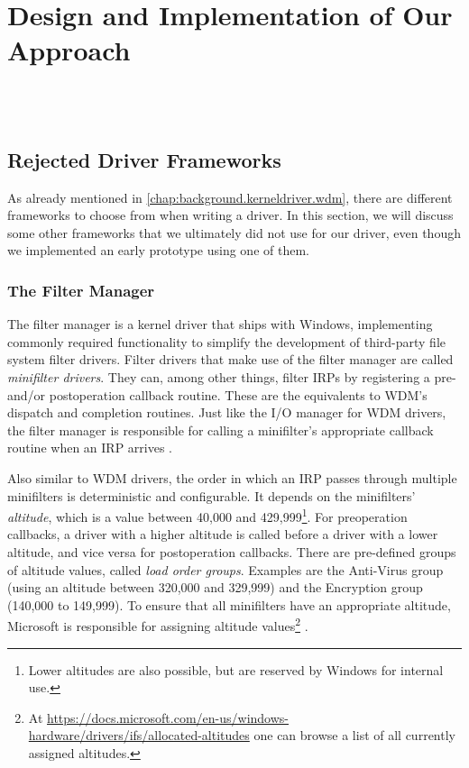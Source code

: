 \chapter{Design and Implementation of Our Approach}
\label{chap:ourapproach}
\\
\\

\section{Rejected Driver Frameworks}
\label{chap:ourapproach.rejected}
As already mentioned in \autoref{chap:background.kerneldriver.wdm}, there are different frameworks to choose from when writing a driver. In this section, we will discuss some other frameworks that we ultimately did not use for our driver, even though we implemented an early prototype using one of them.

\subsection{The Filter Manager}
\label{chap:ourapproach.rejected.fltmgr}
The filter manager is a kernel driver that ships with Windows, implementing commonly required functionality to simplify the development of third-party file system filter drivers. Filter drivers that make use of the filter manager are called \emph{minifilter drivers}. They can, among other things, filter IRPs by registering a pre- and/or postoperation callback routine. These are the equivalents to WDM's dispatch and completion routines. Just like the I/O manager for WDM drivers, the filter manager is responsible for calling a minifilter's appropriate callback routine when an IRP arrives \cite{Fltmgr}.

Also similar to WDM drivers, the order in which an IRP passes through multiple minifilters is deterministic and configurable. It depends on the minifilters' \emph{altitude}, which is a value between 40,000 and 429,999\footnote{\label{fn:ourapproach.rejected.altitudevalues} Lower altitudes are also possible, but are reserved by Windows for internal use.}. For preoperation callbacks, a driver with a higher altitude is called before a driver with a lower altitude, and vice versa for postoperation callbacks. There are pre-defined groups of altitude values, called \emph{load order groups}. Examples are the Anti-Virus group (using an altitude between 320,000 and 329,999) and the Encryption group (140,000 to 149,999). To ensure that all minifilters have an appropriate altitude, Microsoft is responsible for assigning altitude values\footnote{\label{fn:ourapproach.rejected.assignedaltitudes} At \url{https://docs.microsoft.com/en-us/windows-hardware/drivers/ifs/allocated-altitudes} one can browse a list of all currently assigned altitudes.} \cite{Fltmgr}.

